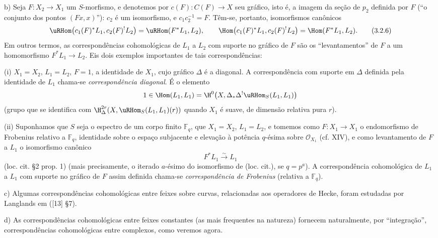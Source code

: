 b) Seja $F:X_2\to X_1$ um $S$-morfismo, e denotemos por $c(F):C(F)\to X$ seu gráfico, isto é, a imagem da seção de $p_2$ definida por $F$ (``o conjunto dos pontos $(Fx,x)$''): $c_2$ é um isomorfismo, e $c_1c_2^{-1}=F$. Têm-se, portanto, isomorfismos canônicos
\begin{equation}
\uRHom\bigl(c_1(F)^*L_1,c_2(F)^!L_2\bigr)=\uRHom(F^*L_1,L_2),
\qquad
\Hom\bigl(c_1(F)^*L_1,c_2(F)^!L_2\bigr)=\Hom(F^*L_1,L_2).
\tag{3.2.6}
\end{equation}
Em outros termos, as correspondências cohomológicas de $L_1$ a $L_2$ com suporte no gráfico de $F$ são os ``levantamentos'' de $F$ a um homomorfismo $F^*L_1\to L_2$. Eis dois exemplos importantes de tais correspondências:

(i) $X_1=X_2$, $L_1=L_2$, $F=1$, a identidade de $X_1$, cujo gráfico $\Delta$ é a diagonal. A correspondência com suporte em $\Delta$ definida pela identidade de $L_1$ chama-se \emph{correspondência diagonal}. É o elemento
\[
1\in \Hom(L_1,L_1)=\H^0\bigl(X,\Delta_*\Delta^!\uRHom_S(L_1,L_1)\bigr)
\]
(grupo que se identifica com $\H^{2r}_\Delta(X,\uRHom_S(L_1,L_1)(r))$ quando $X_1$ é suave, de dimensão relativa pura $r$).

(ii) Suponhamos que $S$ seja o espectro de um corpo finito $\mathbb F_q$, que $X_1=X_2$, $L_1=L_2$, e tomemos como $F:X_1\to X_1$ o endomorfismo de Frobenius relativo a $\mathbb F_q$, identidade sobre o espaço subjacente e elevação à potência $q$-ésima sobre $\mathcal O_{X_1}$ (cf. XIV), e como levantamento de $F$ a $L_1$ o isomorfismo canônico
\[
F^*L_1\xrightarrow{\sim}L_1
\]
(loc. cit. §2 prop. 1) (mais precisamente, o iterado $a$-ésimo do isomorfismo de (loc. cit.), se $q=p^a$). A correspondência cohomológica de $L_1$ a $L_1$ com suporte no gráfico de $F$ assim definida chama-se \emph{correspondência de Frobenius} (relativa a $\mathbb F_q$).

c) Algumas correspondências cohomológicas entre feixes sobre curvas, relacionadas aos operadores de Hecke, foram estudadas por Langlands em ([13] §7).

d) As correspondências cohomológicas entre feixes constantes (as mais frequentes na natureza) fornecem naturalmente, por ``integração'', correspondências cohomológicas entre complexos, como veremos agora.
